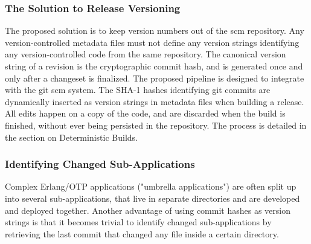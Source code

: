 \subsubsection{The Solution to Release Versioning}
The proposed solution is to keep version numbers out of the \acrshort{scm} repository. Any version-controlled metadata files must not define any version strings identifying any version-controlled code from the same repository. The canonical version string of a revision is the cryptographic commit hash, and is generated once and only after a changeset is finalized. The proposed pipeline is designed to integrate with the git \acrshort{scm} system. The SHA-1 hashes identifying git commits are dynamically inserted as version strings in metadata files when building a release. All edits happen on a copy of the code, and are discarded when the build is finished, without ever being persisted in the repository. The process is detailed in the section on Deterministic Builds.

\subsubsection{Identifying Changed Sub-Applications}
Complex Erlang/OTP applications ("umbrella applications") are often split up into several sub-applications, that live in separate directories and are developed and deployed together. Another advantage of using commit hashes as version strings is that it becomes trivial to identify changed sub-applications by retrieving the last commit that changed any file inside a certain directory.


